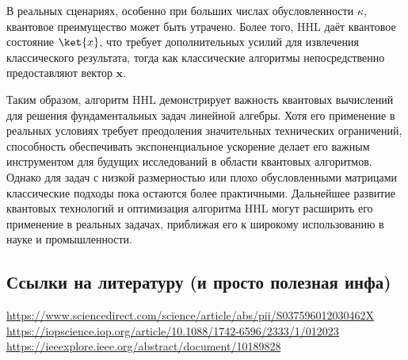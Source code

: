 В реальных сценариях, особенно при больших числах обусловленности \( \kappa \), квантовое преимущество может быть утрачено. Более того, HHL даёт квантовое состояние \( \ket{x} \), что требует дополнительных усилий для извлечения классического результата, тогда как классические алгоритмы непосредственно предоставляют вектор \( \mathbf{x} \).

\textbf{ }

Таким образом, алгоритм HHL демонстрирует важность квантовых вычислений для решения фундаментальных задач линейной алгебры. Хотя его применение в реальных условиях требует преодоления значительных технических ограничений, способность обеспечивать экспоненциальное ускорение делает его важным инструментом для будущих исследований в области квантовых алгоритмов. Однако для задач с низкой размерностью или плохо обусловленными матрицами классические подходы пока остаются более практичными. Дальнейшее развитие квантовых технологий и оптимизация алгоритма HHL могут расширить его применение в реальных задачах, приближая его к широкому использованию в науке и промышленности.


\subsection*{Ссылки на литературу (и просто полезная инфа)}

\url{https://www.sciencedirect.com/science/article/abs/pii/S037596012030462X}
\url{https://iopscience.iop.org/article/10.1088/1742-6596/2333/1/012023}
\url{https://ieeexplore.ieee.org/abstract/document/10189828}
